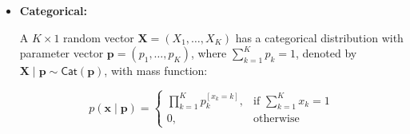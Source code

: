\begin{appendix}
\begin{itemize}
A $K \times 1$ random vector $\bm{X} = (X_1, \dots, X_K)$ has a Dirichlet distribution with parameter vector $\bm{\alpha} = (\alpha_1, \dots, \alpha_K)$, where $\alpha_k > 0$, denoted by $\bm{X}\mid\bm{\alpha} \sim \mathsf{Dir}(\bm{\alpha})$, with density function:

$$
p(\bm{x} \mid \bm{\alpha}) = 
\begin{cases}
\frac{\Gamma\left( \sum_{k=1}^{K} \alpha_k \right)}{\prod_{k=1}^{K} \Gamma(\alpha_k)} \prod_{k=1}^{K} x_k^{\alpha_k - 1}, & \text{if } \sum_{k=1}^{K} x_k = 1 \\
0, & \text{otherwise}
\end{cases}
$$

\begin{itemize}
\item \textit{Sufficient statistics:} $\bm{t}(\bm{x}) = (\log x_1, \dots, \log x_K)^\top$
\item \textit{Natural parameter:} $\bm{\eta}=(\alpha_1 - 1,\cdots,\alpha_K - 1)^\top$
\item \textit{Inverse mapping:} Given $\bm{\eta} = (\eta_1,\dots,\eta_K)^\top$,
$$
\alpha_k = \eta_k + 1,\quad k=1,\dots,K.
$$
\item \textit{Key Expectations:} 
\begin{itemize}
\item $\mathsf{E}[X_k] = \dfrac{\alpha_k}{\sum_{k=1}^{K}\alpha_k}$.
\item $\mathsf{E}[\log X_k] = \psi(\alpha_k) - \psi(\sum_{k=1}^{K}\alpha_k)$
\item $\mathsf{E}[\log p(\bm{X} \mid \bm{\alpha})] = \log\Gamma\left( \sum_{k=1}^{K} \alpha_k \right)-\sum_{k=1}^{K} \log\Gamma(\alpha_k)+\sum_{k=1}^{K}(\alpha_k-1)\left(\psi(\alpha_k) - \psi(\sum_{k=1}^{K}\alpha_k)\right)$
\end{itemize}
\end{itemize}

\item \textbf{Categorical:}

A $K \times 1$ random vector $\bm{X} = (X_1, \dots, X_K)$ has a categorical distribution with parameter vector $\bm{p} = (p_1, \dots, p_K)$, where $\sum_{k=1}^{K} p_k = 1$, denoted by $\bm{X}\mid\bm{p} \sim \mathsf{Cat}(\bm{p})$, with mass function:

$$
p(\bm{x} \mid \bm{p}) = 
\begin{cases}
\prod_{k=1}^{K} p_k^{[x_k = k]}, & \text{if } \sum_{k=1}^{K} x_k = 1 \\
0, & \text{otherwise}
\end{cases}
$$


\end{itemize}
\end{appendix}
